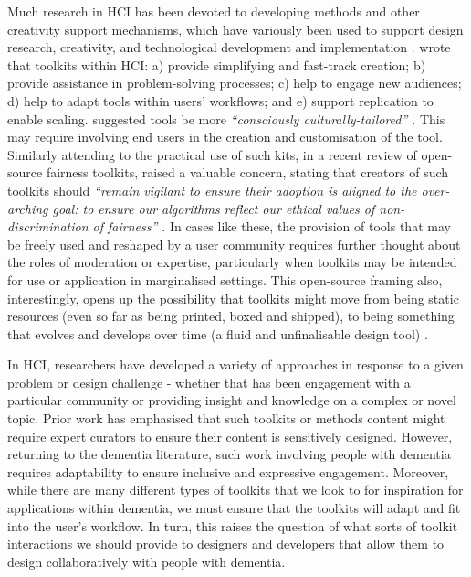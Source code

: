 Much research in HCI has been devoted to developing methods and other creativity support mechanisms, which have variously been used to support design research, creativity, and technological development and implementation \citep{broderick2020theory}. \cite{ledo2018evaluation} wrote that toolkits within HCI: a) provide simplifying and fast-track creation; b) provide assistance in problem-solving processes; c) help to engage new audiences; d) help to adapt tools within users' workflows; and e) support replication to enable scaling. \cite{peters2020toolkits} suggested tools be more \textit{``consciously culturally-tailored'' \citep[p.20]{peters2020toolkits}}. This may require involving end users in the creation and customisation of the tool. Similarly attending to the practical use of such kits, in a recent review of open-source fairness toolkits, \cite{lee2021landscape} raised a valuable concern, stating that creators of such toolkits should \textit{``remain vigilant to ensure their adoption is aligned to the over-arching goal: to ensure our algorithms reflect our ethical values of non-discrimination of fairness'' \citep[p.12]{lee2021landscape}}. In cases like these, the provision of tools that may be freely used and reshaped by a user community requires further thought about the roles of moderation or expertise, particularly when toolkits may be intended for use or application in marginalised settings. This open-source framing also, interestingly, opens up the possibility that toolkits might move from being static resources (even so far as being printed, boxed and shipped), to being something that evolves and develops over time (a fluid and unfinalisable design tool) \citep{braybrooke2020together}.

In HCI, researchers have developed a variety of approaches in response to a given problem or design challenge -  whether that has been engagement with a particular community or providing insight and knowledge on a complex or novel topic. Prior work has emphasised that such toolkits or methods content might require expert curators to ensure their content is sensitively designed. However, returning to the dementia literature, such work involving people with dementia requires adaptability to ensure inclusive and expressive engagement. Moreover, while there are many different types of toolkits that we look to for inspiration for applications within dementia, we must ensure that the toolkits will adapt and fit into the user’s workflow. In turn, this raises the question of what sorts of toolkit interactions we should provide to designers and developers that allow them to design collaboratively with people with dementia.


